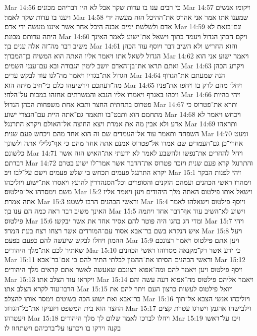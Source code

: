 Mar 14:56  כי רבים ענו בו עדות שקר אבל לא היו דבריהם מכונים׃
Mar 14:57  ויקומו אנשים ויענו בו עדות שקר לאמר׃
Mar 14:58  שמענו אתו אמר אני אהרס את־ההיכל הזה מעשה ידי אדם ולשלשת ימים אבנה היכל אחר אשר איננו מעשה ידי אדם׃
Mar 14:59  וגם־בזאת לא היתה עדותם מכונת׃
Mar 14:60  ויקם הכהן הגדול ויעמד בתוך וישאל את־ישוע לאמר האינך משיב דבר מה־זה אלה ענים בך׃
Mar 14:61  והוא החריש ולא השיב דבר ויוסף עוד הכהן הגדול לשאל אתו ויאמר אליו האתה הוא המשיח בן־המברך׃
Mar 14:62  ויאמר ישוע אני הוא ואתם תראו את־בן־האדם יושב לימין הגבורה ובא עם־ענני השמים׃
Mar 14:63  ויקרע הכהן הגדול את־בגדיו ויאמר מה־לנו עוד לבקש עדים׃
Mar 14:64  הנה שמעתם את־הגדוף מה־דעתכם וירשיעהו כלם כי־חיב מיתה הוא׃
Mar 14:65  ויחלו מהם לרק בו ויחפו את־פניו ויכהו באגרף ויאמרו אליו הנבא והמשרתים אחזהו במכות על־הלחי׃
Mar 14:66  ויהי בהיות פטרוס בתחתית החצר ותבא אחת משפחות הכהן הגדול׃
Mar 14:67  ותרא את־פטרוס כי מתחמם הוא ותבט־בו ותאמר גם־אתה היית עם־הנצרי ישוע׃
Mar 14:68  ויכחש ויאמר לא אדע ולא אבין מה את אמרת ויצא החוצה אל־האולם ויקרא התרנגל׃
Mar 14:69  ותראהו השפחה ותאמר עוד אל־העמדים שם זה הוא אחד מהם ויכחש פעם שנית׃
Mar 14:70  ומעט אחרי־כן גם־העמדים שם אמרו אל־פטרוס אמנם אתה אחד מהם כי אף־גלילי אתה ולשונך כלשונם׃
Mar 14:71  ויחל להחרים את־נפשו ולהשבע לאמר לא ידעתי את־האיש הזה אשר דברתם׃
Mar 14:72  והתרנגל קרא פעם שנית ויזכר פטרוס את־הדבר אשר אמר־לו ישוע בטרם יקרא התרנגל פעמים תכחש בי שלש פעמים וישם על־לבו ויב׃
Mar 15:1  ויהי לפנות הבקר וימהרו ראשי הכהנים ועמהם הזקנים והסופרים וכל־הסנהדרין להועץ ויאסרו את־ישוע ויוליכהו משם וימסרהו אל־פילטוס׃
Mar 15:2  וישאל אותו פילטוס האתה מלך היהודים ויען ויאמר אליו אתה אמרת׃
Mar 15:3  וראשי הכהנים הרבו לשטנו׃
Mar 15:4  ויוסף פילטוס וישאלהו לאמר האינך משיב דבר ראה כמה הם ענו בך׃
Mar 15:5  וישוע לא־השיב עוד אף־דבר אחד ויתמה פילטוס׃
Mar 15:6  ומדי חג בחגו היה פוטר להם אסיר אחד את אשר יבקשו׃
Mar 15:7  ויהי איש הנקרא בשם בר־אבא אסור עם־המורדים אשר רצחו רצח בעת המרד׃
Mar 15:8  ויעל ההמון ויחלו לבקש שיעשה להם כפעם בפעם׃
Mar 15:9  ויען אתם פילטוס ויאמר רצונכם שאתיר לכם את־מלך היהודים׃
Mar 15:10  כי ידע אשר רק־מקנאה מסרוהו ראשי הכהנים׃
Mar 15:11  וראשי הכהנים הסיתו את־ההמון לבלתי התיר להם כי אם־בר־אבא׃
Mar 15:12  ויסף פילטוס ויען ויאמר להם ומה־אפוא רצונכם שאעשה לאשר אתם קראים מלך היהודים׃
Mar 15:13  ויקראו עוד הצלב אתו׃
Mar 15:14  ויאמר אליהם פילטוס מה־אפוא רעה עשה והם הרבו־עוד לקרא הצלב אתו׃
Mar 15:15  ויואל פילטוס לעשות כרצון העם ויתר להם את בר־אבא ואת ישוע הכה בשוטים וימסר אותו להצלב׃
Mar 15:16  ויוליכהו אנשי הצבא אל־תוך החצר הוא בית המשפט ויזעיקו את־כל־הגדוד׃
Mar 15:17  וילבישהו ארגמן וישרגו עטרת קצים ויעטרהו׃
Mar 15:18  ויחלו לברכו לאמר שלום לך מלך היהודים׃
Mar 15:19  ויכו על־ראשו בקנה וירקו בו ויכרעו על־ברכיהם וישתחוו לו׃
